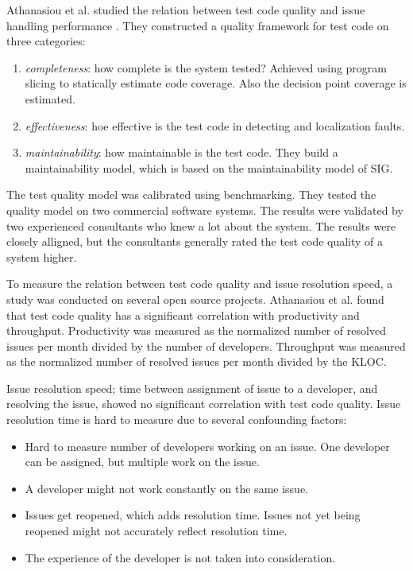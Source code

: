\documentclass{uvamscse}
\newcommand{\AtestCodeQuality}{Athanasiou et al.}
\begin{document}
\AtestCodeQuality{} studied the relation between test code quality and issue handling performance \cite{athanasiou2014test}. They constructed a quality framework for test code on three categories:

\begin{enumerate}
	\item \textit{completeness}: how complete is the system tested? Achieved using program slicing to statically estimate code coverage. Also the decision point coverage is estimated.
	\item \textit{effectiveness}: hoe effective is the test code in detecting and localization faults. 
	\item \textit{maintainability}: how maintainable is the test code. They build a  maintainability model, which is based on the maintainability model of SIG. 
\end{enumerate}

The test quality model was calibrated using benchmarking. They tested the quality model on two commercial software systems. The results were validated by two experienced consultants who knew a lot about the system. The results were closely alligned, but the consultants generally rated the test code quality of a system higher.

To measure the relation between test code quality and issue resolution speed, a study was conducted on several open source projects. \AtestCodeQuality{} found that test code quality has a significant correlation with productivity and throughput. Productivity was measured as the normalized number of resolved issues per month divided by the number of developers. Throughput was measured as the normalized number of resolved issues per month divided by the KLOC. 

Issue resolution speed; time between assignment of issue to a developer, and resolving the issue, showed no significant correlation with test code quality. Issue resolution time is hard to measure due to several confounding factors:

\begin{itemize}
	\item Hard to measure number of developers working on an issue. One developer can be assigned, but multiple work on the issue.
	\item A developer might not work constantly on the same issue.
	\item Issues get reopened, which adds resolution time. Issues not yet being reopened might not accurately reflect resolution time.
	\item The experience of the developer is not taken into consideration.
\end{itemize}
\end{document}
